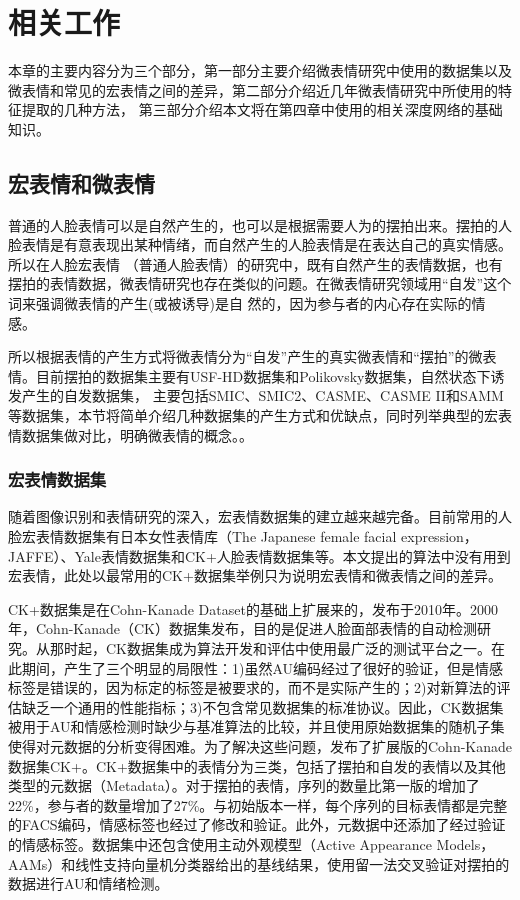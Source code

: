 \chapter{相关工作}\label{chap:relate}

本章的主要内容分为三个部分，第一部分主要介绍微表情研究中使用的数据集以及微表情和常见的宏表情之间的差异，第二部分介绍近几年微表情研究中所使用的特征提取的几种方法，
第三部分介绍本文将在第四章中使用的相关深度网络的基础知识。

\section{宏表情和微表情}

普通的人脸表情可以是自然产生的，也可以是根据需要人为的摆拍出来。摆拍的人脸表情是有意表现出某种情绪，而自然产生的人脸表情是在表达自己的真实情感。所以在人脸宏表情
（普通人脸表情）的研究中，既有自然产生的表情数据，也有摆拍的表情数据，微表情研究也存在类似的问题。在微表情研究领域用“自发”这个词来强调微表情的产生(或被诱导)是自
然的，因为参与者的内心存在实际的情感。

所以根据表情的产生方式将微表情分为“自发”产生的真实微表情和“摆拍”的微表情。目前摆拍的数据集主要有USF-HD数据集和Polikovsky数据集，自然状态下诱发产生的自发数据集，
主要包括SMIC、SMIC2、CASME、CASME II和SAMM等数据集，本节将简单介绍几种数据集的产生方式和优缺点，同时列举典型的宏表情数据集做对比，明确微表情的概念。。

\subsection{宏表情数据集}

随着图像识别和表情研究的深入，宏表情数据集的建立越来越完备。目前常用的人脸宏表情数据集有日本女性表情库（The Japanese female facial expression，JAFFE）\citep{Lyons2002Coding}、Yale表情数据集\citep{Belhumeur2002Eigenfaces}和CK+人脸表情数据集\citep{Lucey2010The}等。本文提出的算法中没有用到宏表情，此处以最常用的CK+数据集举例只为说明宏表情和微表情之间的差异。

CK+数据集是在Cohn-Kanade Dataset的基础上扩展来的，发布于2010年。2000年，Cohn-Kanade（CK）数据集发布，目的是促进人脸面部表情的自动检测研究。从那时起，CK数据集成为算法开发和评估中使用最广泛的测试平台之一。在此期间，产生了三个明显的局限性：1)虽然AU编码经过了很好的验证，但是情感标签是错误的，因为标定的标签是被要求的，而不是实际产生的；2)对新算法的评估缺乏一个通用的性能指标；3)不包含常见数据集的标准协议。因此，CK数据集被用于AU和情感检测时缺少与基准算法的比较，并且使用原始数据集的随机子集使得对元数据的分析变得困难。为了解决这些问题，发布了扩展版的Cohn-Kanade数据集CK+。CK+数据集中的表情分为三类，包括了摆拍和自发的表情以及其他类型的元数据（Metadata）。对于摆拍的表情，序列的数量比第一版的增加了22\%，参与者的数量增加了27\%。与初始版本一样，每个序列的目标表情都是完整的FACS编码，情感标签也经过了修改和验证。此外，元数据中还添加了经过验证的情感标签。数据集中还包含使用主动外观模型（Active Appearance Models，AAMs）和线性支持向量机分类器给出的基线结果，使用留一法交叉验证对摆拍的数据进行AU和情绪检测。

